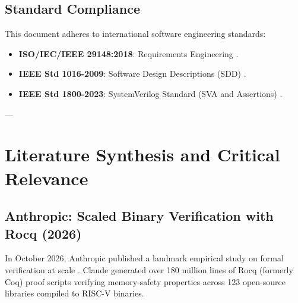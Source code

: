 \documentclass[11pt,a4paper]{article}
\begin{document}
\subsection{Standard Compliance}
This document adheres to international software engineering standards:
\begin{itemize}[noitemsep]
    \item \textbf{ISO/IEC/IEEE 29148:2018}: Requirements Engineering \cite{iso29148_2018}.
    \item \textbf{IEEE Std 1016-2009}: Software Design Descriptions (SDD) \cite{ieee1016_2009}.
    \item \textbf{IEEE Std 1800-2023}: SystemVerilog Standard (SVA and Assertions) \cite{ieee1800_2023}.
\end{itemize}

---

\section{Literature Synthesis and Critical Relevance}

\subsection{Anthropic: Scaled Binary Verification with Rocq (2026)}
In October 2026, Anthropic published a landmark empirical study on formal verification at scale \cite{anthropic2026formalverification}. Claude generated over 180 million lines of Rocq (formerly Coq) proof scripts verifying memory-safety properties across 123 open-source libraries compiled to RISC-V binaries.
\end{document}
